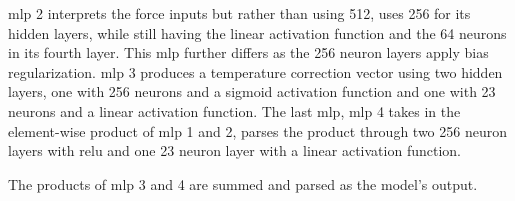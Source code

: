 \gls{mlp} \num{2} interprets the force inputs but rather than using \num{512}, uses \num{256} for its hidden layers, while still having the linear activation function and the \num{64} neurons in its fourth layer. This \gls{mlp} further differs as the \num{256} neuron layers apply  bias regularization. \gls{mlp} \num{3} produces a temperature correction vector using two hidden layers, one with \num{256} neurons and a sigmoid activation function and one with \num{23} neurons and a linear activation function. The last \gls{mlp}, \gls{mlp} \num{4} takes in the element-wise product of \gls{mlp} \num{1} and \num{2}, parses the product through two \num{256} neuron layers with \gls{relu} and one \num{23} neuron layer with a linear activation function.\medskip

The products of \gls{mlp} \num{3} and \num{4} are summed and parsed as the model's output.






